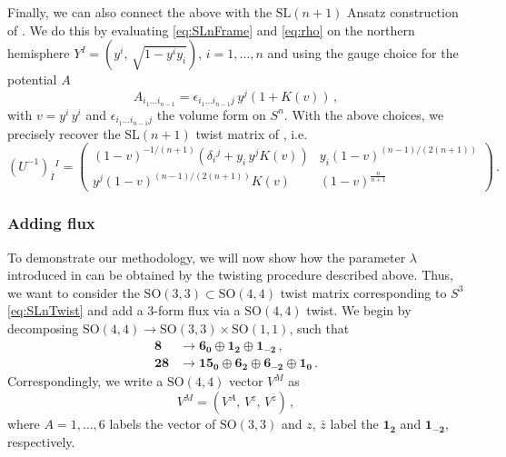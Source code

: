 \documentclass[a4paper, 11pt]{article}
\numberwithin{equation}{section}
\newcommand{\ov}[1]{\overline{#1}}
\newcommand{\SL}[1]{\mathrm{SL}( #1 )}
\newcommand{\SO}[1]{\mathrm{SO}( #1 )}
\newcommand{\+}{\oplus}
\newcommand{\UI}{\left(U^{-1}\right)}
\newcommand{\fl}[1]{\ov{#1}}
\begin{document}
Finally, we can also connect the above with the $\SL{n+1}$ Ansatz construction of \cite{Hohm:2014qga}. We do this by evaluating \eqref{eq:SLnFrame} and \eqref{eq:rho} on the northern hemisphere $Y^I = \left( y^i,\, \sqrt{1-y^i y_i}\right)$, $i = 1, \ldots, n$ and using the gauge choice for the potential $A$
\begin{equation}
	A_{i_1 \ldots i_{n-1}} = \epsilon_{i_1 \ldots i_{n-1}j}\, y^j (1 + K(v)) \,,
\end{equation}
with $v = y^i\, y^i$ and $\epsilon_{i_1 \ldots i_{n-1}j}$ the volume form on $S^n$. With the above choices, we precisely recover the $\SL{n+1}$ twist matrix of \cite{Hohm:2014qga}, i.e.
\begin{equation} \label{eq:SLnTwist}
	\UI_{\fl{I}}{}^I = \begin{pmatrix}
		\left(1-v\right)^{-1/(n+1)} \left( \delta_i{}^j + y_i\, y^j K(v) \right) & y_i \left(1-v\right)^{(n-1)/(2(n+1))} \\
		y^j \left(1-v\right)^{(n-1)/(2(n+1))} K(v) & \left(1-v\right)^{\tfrac{n}{n+1}}
	\end{pmatrix} \,.
\end{equation}

\subsubsection{Adding flux}
To demonstrate our methodology, we will now show how the parameter $\lambda$ introduced in \cite{Eloy:2021fhc} can be obtained by the twisting procedure described above. Thus, we want to consider the $\SO{3,3} \subset \SO{4,4}$ twist matrix corresponding to $S^3$ \eqref{eq:SLnTwist} and add a 3-form flux via a $\SO{4,4}$ twist. We begin by decomposing $\SO{4,4} \rightarrow \SO{3,3} \times \SO{1,1}$, such that
\begin{equation}
	\begin{split}
		\mathbf{8} &\rightarrow \mathbf{6_0} \oplus \mathbf{1_2} \oplus \mathbf{1_{-2}} \,, \\
		\mathbf{28} &\rightarrow \mathbf{15_0} \oplus \mathbf{6_2} \oplus \mathbf{6_{-2}} \oplus \mathbf{1_0} \,.
	\end{split}
\end{equation}
Correspondingly, we write a $\SO{4,4}$ vector $V^M$ as
\begin{equation}
	V^M = \left( V^A,\, V^z,\, V^{\bar{z}} \right) \,,
\end{equation}
where $A = 1, \ldots, 6$ labels the vector of $\SO{3,3}$ and $z$, $\bar{z}$ label the $\mathbf{1_2}$ and $\mathbf{1_{-2}}$, respectively.
\end{document}
